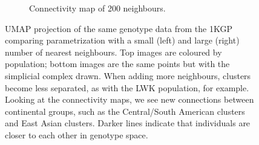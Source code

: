\documentclass[12pt]{article}
\begin{document}
\begin{figure}[h!]
\begin{subfigure}[b]{0.49\linewidth}
    \caption{Connectivity map of 200 neighbours.}
    \label{fig:UMAP_high_NN_connectivity}
  \end{subfigure}
  \caption{UMAP projection of the same genotype data from the 1KGP comparing parametrization with a small (left) and large (right) number of nearest neighbours. Top images are coloured by population; bottom images are the same points but with the simplicial complex drawn. When adding more neighbours, clusters become less separated, as with the LWK population, for example. Looking at the connectivity maps, we see new connections between continental groups, such as the Central/South American clusters and East Asian clusters. Darker lines indicate that individuals are closer to each other in genotype space.}
  \label{fig:UMAP_connectivity}
\end{figure}

\clearpage
\newpage




\end{document}
